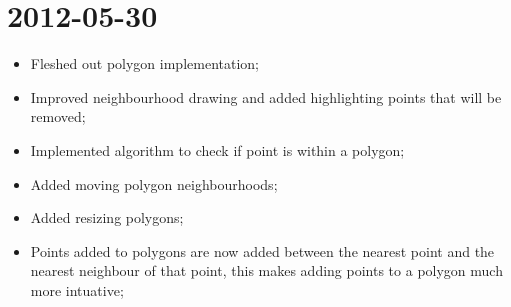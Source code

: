 \documentclass{report}
\begin{document}
\section*{2012-05-30}
\begin{itemize}
  \item 
    Fleshed out polygon implementation;
  \item
    Improved neighbourhood drawing and added highlighting points that will be removed;
  \item
    Implemented algorithm to check if point is within a polygon;
  \item
    Added moving polygon neighbourhoods;
  \item
    Added resizing polygons;
  \item
    Points added to polygons are now added between the nearest point and the nearest neighbour of that point, this makes adding points to a polygon much more intuative;
\end{itemize}
\end{document}

